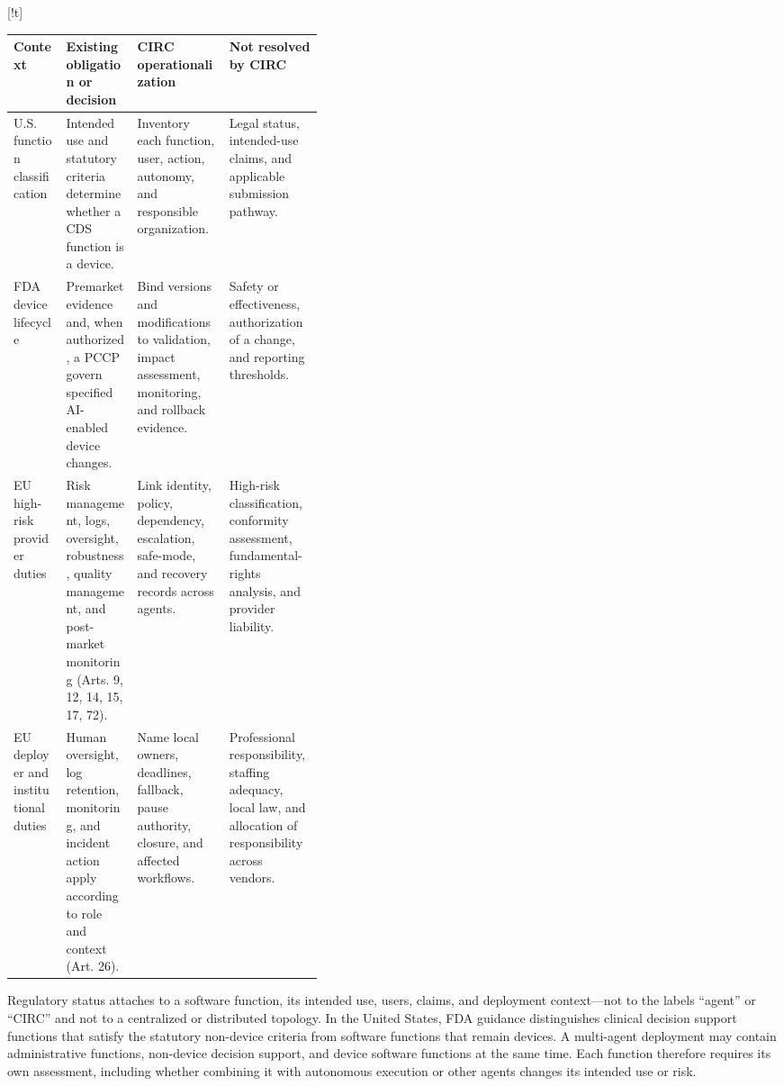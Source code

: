 \documentclass[10pt]{article}
\makeatletter
\renewenvironment{table}[1][tbp]{\@dblfloat{table}[#1]}{\end@dblfloat}
\makeatother
\begin{document}
\begin{table}[!t]
\centering
\caption{Regulatory obligations, CIRC operational evidence, and unresolved boundaries.}
\label{tab:regulatory-boundary}
\footnotesize
\begin{tabularx}{\linewidth}{B{0.17\linewidth}p{0.23\linewidth}YY}
\toprule
Context & Existing obligation or decision & CIRC operationalization & Not resolved by CIRC \\
\midrule
U.S. function classification & Intended use and statutory criteria determine whether a CDS function
is a device. & Inventory each function, user, action, autonomy, and responsible organization. & Legal
status, intended-use claims, and applicable submission pathway. \\
FDA device lifecycle & Premarket evidence and, when authorized, a PCCP govern specified AI-enabled
device changes. & Bind versions and modifications to validation, impact assessment, monitoring, and
rollback evidence. & Safety or effectiveness, authorization of a change, and reporting thresholds. \\
EU high-risk provider duties & Risk management, logs, oversight, robustness, quality management, and
post-market monitoring (Arts. 9, 12, 14, 15, 17, 72). & Link identity, policy, dependency, escalation,
safe-mode, and recovery records across agents. & High-risk classification, conformity assessment,
fundamental-rights analysis, and provider liability. \\
EU deployer and institutional duties & Human oversight, log retention, monitoring, and incident action
apply according to role and context (Art. 26). & Name local owners, deadlines, fallback, pause
authority, closure, and affected workflows. & Professional responsibility, staffing adequacy, local
law, and allocation of responsibility across vendors. \\
\bottomrule
\end{tabularx}
\end{table}

Regulatory status attaches to a software function, its intended use, users, claims, and deployment
context---not to the labels ``agent'' or ``CIRC'' and not to a centralized or distributed topology.
In the United States, FDA guidance distinguishes clinical decision support functions that satisfy the
statutory non-device criteria from software functions that remain devices.\cite{fda2026cds} A
multi-agent deployment may contain administrative functions, non-device decision support, and device
software functions at the same time. Each function therefore requires its own assessment, including
whether combining it with autonomous execution or other agents changes its intended use or risk.
\end{document}
